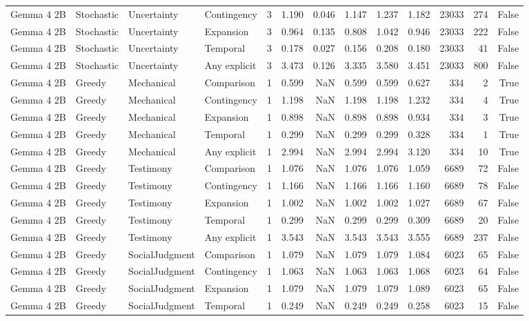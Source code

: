 \begin{tabular}{llllrrrrrrrrr}
Gemma 4 2B & Stochastic & Uncertainty & Contingency & 3 & 1.190 & 0.046 & 1.147 & 1.237 & 1.182 & 23033 & 274 & False \\
Gemma 4 2B & Stochastic & Uncertainty & Expansion & 3 & 0.964 & 0.135 & 0.808 & 1.042 & 0.946 & 23033 & 222 & False \\
Gemma 4 2B & Stochastic & Uncertainty & Temporal & 3 & 0.178 & 0.027 & 0.156 & 0.208 & 0.180 & 23033 & 41 & False \\
Gemma 4 2B & Stochastic & Uncertainty & Any explicit & 3 & 3.473 & 0.126 & 3.335 & 3.580 & 3.451 & 23033 & 800 & False \\
Gemma 4 2B & Greedy & Mechanical & Comparison & 1 & 0.599 & NaN & 0.599 & 0.599 & 0.627 & 334 & 2 & True \\
Gemma 4 2B & Greedy & Mechanical & Contingency & 1 & 1.198 & NaN & 1.198 & 1.198 & 1.232 & 334 & 4 & True \\
Gemma 4 2B & Greedy & Mechanical & Expansion & 1 & 0.898 & NaN & 0.898 & 0.898 & 0.934 & 334 & 3 & True \\
Gemma 4 2B & Greedy & Mechanical & Temporal & 1 & 0.299 & NaN & 0.299 & 0.299 & 0.328 & 334 & 1 & True \\
Gemma 4 2B & Greedy & Mechanical & Any explicit & 1 & 2.994 & NaN & 2.994 & 2.994 & 3.120 & 334 & 10 & True \\
Gemma 4 2B & Greedy & Testimony & Comparison & 1 & 1.076 & NaN & 1.076 & 1.076 & 1.059 & 6689 & 72 & False \\
Gemma 4 2B & Greedy & Testimony & Contingency & 1 & 1.166 & NaN & 1.166 & 1.166 & 1.160 & 6689 & 78 & False \\
Gemma 4 2B & Greedy & Testimony & Expansion & 1 & 1.002 & NaN & 1.002 & 1.002 & 1.027 & 6689 & 67 & False \\
Gemma 4 2B & Greedy & Testimony & Temporal & 1 & 0.299 & NaN & 0.299 & 0.299 & 0.309 & 6689 & 20 & False \\
Gemma 4 2B & Greedy & Testimony & Any explicit & 1 & 3.543 & NaN & 3.543 & 3.543 & 3.555 & 6689 & 237 & False \\
Gemma 4 2B & Greedy & SocialJudgment & Comparison & 1 & 1.079 & NaN & 1.079 & 1.079 & 1.084 & 6023 & 65 & False \\
Gemma 4 2B & Greedy & SocialJudgment & Contingency & 1 & 1.063 & NaN & 1.063 & 1.063 & 1.068 & 6023 & 64 & False \\
Gemma 4 2B & Greedy & SocialJudgment & Expansion & 1 & 1.079 & NaN & 1.079 & 1.079 & 1.089 & 6023 & 65 & False \\
Gemma 4 2B & Greedy & SocialJudgment & Temporal & 1 & 0.249 & NaN & 0.249 & 0.249 & 0.258 & 6023 & 15 & False \\

\end{tabular}
